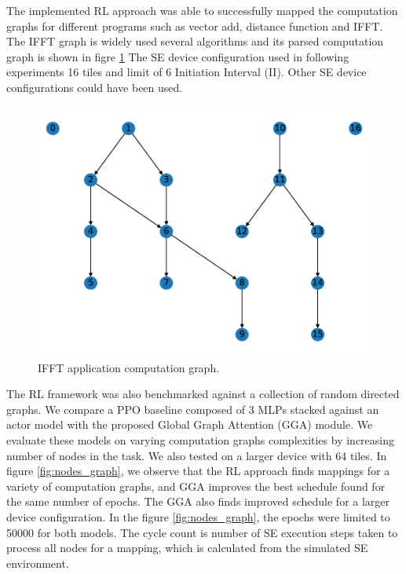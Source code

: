 The implemented RL approach was able to successfully mapped the computation graphs for different programs such as vector add, distance function and IFFT. 
The IFFT graph is widely used several algorithms and its parsed computation graph is shown in figre \ref{fig:ifft_graph} 
The SE device configuration used in following experiments 16 tiles and limit of 6 Initiation Interval (II). 
Other SE device configurations could have been used.

\begin{figure}[h]
  \centering
  \includegraphics[scale=0.4]{fig/ifft_graph.pdf}
  \caption{IFFT application computation graph.}
  \label{fig:ifft_graph}
\end{figure}


The RL framework was also benchmarked against a collection of random directed graphs. We compare a 
PPO baseline composed of 3 MLPs stacked against an actor model with the proposed Global Graph Attention (GGA) module.
We evaluate these models on varying computation graphs complexities by increasing number of nodes in the task. 
We also tested on a larger device with 64 tiles.
In figure \ref{fig:nodes_graph}, we observe that the RL approach finds mappings for a variety of computation graphs, and GGA
improves the best schedule found for the same number of epochs. The GGA also finds improved schedule for a larger device configuration. 
In the figure \ref{fig:nodes_graph}, the epochs were limited to 50000 for both models. 
The cycle count is number of SE execution steps taken to process all nodes for a mapping, which is calculated from the simulated SE environment. 

